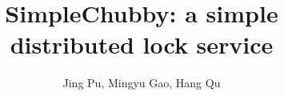 \documentclass[11pt,twocolumn]{article}
\begin{document}
\title{\bf SimpleChubby: a simple distributed lock service}
\author{Jing Pu, Mingyu Gao, Hang Qu}
\date{}
\maketitle
\thispagestyle{empty}









\end{document}
